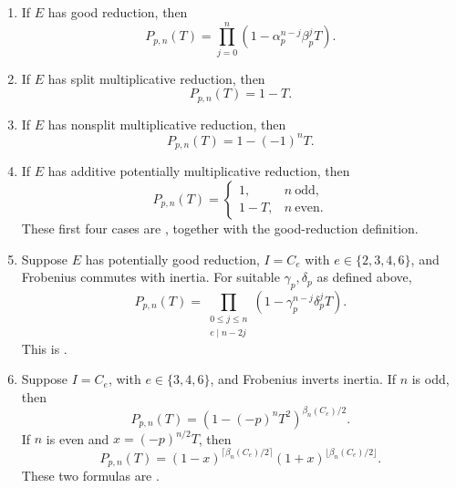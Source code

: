 \documentclass[11pt,reqno]{amsart}
\theoremstyle{definition}
\theoremstyle{remark}
\begin{document}
\begin{enumerate}
\item If $E$ has good reduction, then
\begin{equation}\label{eq:local-good}
 P_{p,n}(T)=
 \prod_{j=0}^{n}
 (1-\alpha_p^{n-j}\beta_p^jT).
\end{equation}

\item If $E$ has split multiplicative reduction, then
\begin{equation}\label{eq:local-split}
 P_{p,n}(T)=1-T.
\end{equation}

\item If $E$ has nonsplit multiplicative reduction, then
\begin{equation}\label{eq:local-nonsplit}
 P_{p,n}(T)=1-(-1)^nT.
\end{equation}

\item If $E$ has additive potentially multiplicative reduction, then
\begin{equation}\label{eq:local-add-pot-mult}
 P_{p,n}(T)=
 \begin{cases}
 1,&n\ \text{odd},\\
 1-T,&n\ \text{even}.
 \end{cases}
\end{equation}
These first four cases are \cite[Proposition~4.1]{DMW}, together with the
good-reduction definition.

\item Suppose $E$ has potentially good reduction, $I=C_e$ with
$e\in\{2,3,4,6\}$, and Frobenius commutes with inertia.  For suitable
$\gamma_p,\delta_p$ as defined above,
\begin{equation}\label{eq:local-cyclic-commuting}
 P_{p,n}(T)=
 \prod_{\substack{0\leq j\leq n\\e\mid n-2j}}
 (1-\gamma_p^{n-j}\delta_p^jT).
\end{equation}
This is \cite[Proposition~5.1]{DMW}.

\item Suppose $I=C_e$, with $e\in\{3,4,6\}$, and Frobenius inverts inertia.
If $n$ is odd, then
\begin{equation}\label{eq:local-cyclic-inverting-odd}
 P_{p,n}(T)=
 (1-(-p)^nT^2)^{\beta_n(C_e)/2}.
\end{equation}
If $n$ is even and $x=(-p)^{n/2}T$, then
\begin{equation}\label{eq:local-cyclic-inverting-even}
 P_{p,n}(T)=
 (1-x)^{\lceil\beta_n(C_e)/2\rceil}
 (1+x)^{\lfloor\beta_n(C_e)/2\rfloor}.
\end{equation}
These two formulas are \cite[Proposition~6.1]{DMW}.


\end{enumerate}
\end{document}
